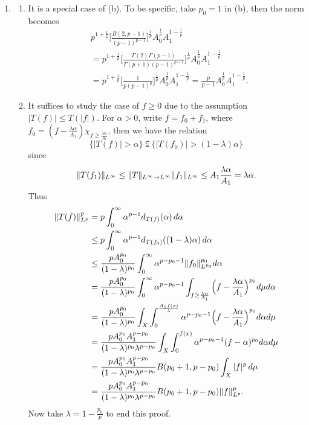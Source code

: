 \begin{enumerate}
\item[1.3.3.]
   \begin{enumerate}
   \item[(a)] It is a special case of (b). To be specific, take $p_0=1$ in (b), 
   then the norm becomes
   \begin{align*}
   &p^{1+\frac{1}{p}}\bigg[\frac{B(2,p-1)}{(p-1)^{p-1}}\bigg]^\frac{1}{p}A_0^\frac{1}{p}A_1^{1-\frac{1}{p}}\\
   &=p^{1+\frac{1}{p}}\bigg[\frac{\varGamma(2)\varGamma(p-1)}{\varGamma(p+1)(p-1)^{p-1}}\bigg]^\frac{1}{p}A_0^\frac{1}{p}A_1^{1-\frac{1}{p}}\\
   &=p^{1+\frac{1}{p}}\bigg[\frac{1}{p(p-1)^p}\bigg]^\frac{1}{p}A_0^\frac{1}{p}A_1^{1-\frac{1}{p}}
   =\frac{p}{p-1}A_0^\frac{1}{p}A_1^{1-\frac{1}{p}}.
   \end{align*}

   \item[(b)] It suffices to study the case of $f\geq0$ due to the assumption $|T(f)|\leq T(|f|)$. 
   For $\alpha > 0$, write $f=f_{0}+f_{1}$, where $f_{0} = (f-\frac{\lambda\alpha}{A_{1}})\chi_{f \geq \frac{\lambda\alpha}{A_{1}}}$, 
   then we have the relation \[\{|T(f)| > \alpha\} 
   \subseteqq \{|T(f_{0})|>(1-\lambda)\alpha\}\] 
   since \[\Vert T(f_{1}) \Vert_{L^\infty} \leq \Vert T \Vert_{L^{\infty} \to L^{\infty}} \Vert f_1 \Vert_{L^\infty}
   \leq A_{1} \frac{\lambda\alpha}{A_{1}} = \lambda\alpha.\] Thus
   \begin{equation*}\begin{aligned}
   \Vert T(f) \Vert_{L^p}^{p} &= p\int_{0}^{\infty}\alpha^{p-1}d_{T(f)}(\alpha)\,d\alpha 
   \\&\leq p\int_{0}^{\infty}\alpha^{p-1}d_{T(f_{0})}((1-\lambda)\alpha)\,d\alpha 
   \\&\leq \frac{pA_{0}^{p_{0}}}{(1-\lambda)^{p_{0}}}
   \int_{0}^{\infty}\alpha^{p-p_{0}-1}\Vert f_{0} \Vert_{L^{p_0}}^{p_{0}}d\alpha 
   \\&= \frac{pA_{0}^{p_{0}}}{(1-\lambda)^{p_{0}}}\int_{0}^{\infty}\alpha^{p-p_{0}-1}
   \int_{f \geq \frac{\lambda\alpha}{A_{1}}}\Big(f-\frac{\lambda\alpha}{A_{1}}\Big)^{p_{0}}d\mu d\alpha
   \\&= \frac{pA_{0}^{p_{0}}}{(1-\lambda)^{p_{0}}}
   \int_{X}\int_{0}^{\frac{A_{1}f(x)}{\lambda}}\alpha^{p-p_{0}-1}
   \Big(f-\frac{\lambda\alpha}{A_{1}}\Big)^{p_{0}} d\alpha d\mu
   \\&= \frac{pA_{0}^{p_{0}}A_{1}^{p-p_{0}}}{(1-\lambda)^{p_{0}}\lambda^{p-p_{0}}}\int_{X}\int_{0}^{f(x)}\alpha^{p-p_{0}-1}(f-\alpha)^{p_{0}}d\alpha d\mu 
   \\&= \frac{pA_{0}^{p_{0}}A_{1}^{p-p_{0}}}{(1-\lambda)^{p_{0}}\lambda^{p-p_{0}}}B(p_{0}+1,p-p_{0})\int_{X}|f|^{p}\,d\mu
   \\&= \frac{pA_{0}^{p_{0}}A_{1}^{p-p_{0}}}{(1-\lambda)^{p_{0}}\lambda^{p-p_{0}}}B(p_{0}+1,p-p_{0}) \Vert f \Vert_{L^p}^{p}.
   \end{aligned}\end{equation*}
   Now take $\lambda=1-\frac{p_{0}}{p}$ to end this proof.


\end{enumerate}
\end{enumerate}
